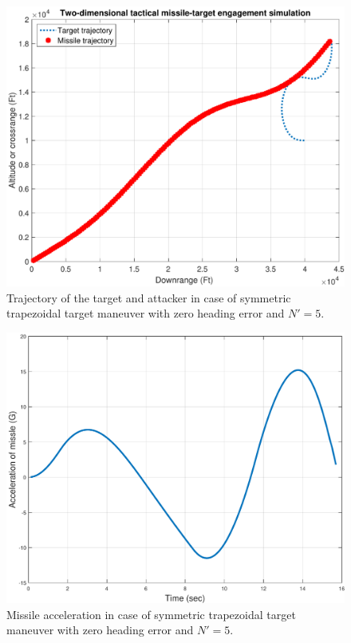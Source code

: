\begin{figure}[htb]
	\centering
	\includegraphics[scale = 0.35]{fig/trajectoryTrapSymm.pdf}
	\caption{Trajectory of the target and attacker in case of symmetric trapezoidal target maneuver with zero heading error and $N'=5$.}
	\label{trajectory trapSymm}
\end{figure}


\begin{figure}[htb]
	\centering
	\includegraphics[scale = 0.35]{fig/MissileAccelerationTrapSymm.pdf}
	\caption{Missile acceleration in case of symmetric trapezoidal target maneuver with zero heading error and $N'=5$.}
	\label{missile acceleration trapSymm}
\end{figure}

